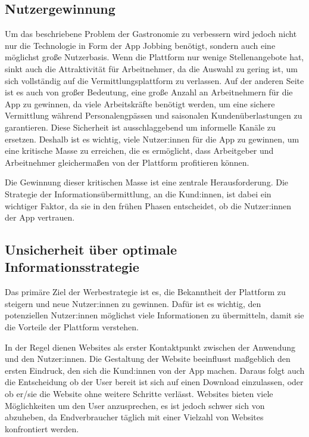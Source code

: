 \subsection{Nutzergewinnung}

Um das beschriebene Problem der Gastronomie zu verbessern wird jedoch nicht nur die 
Technologie in Form der App Jobbing benötigt, sondern auch eine möglichst große Nutzerbasis.
Wenn die Plattform nur wenige Stellenangebote hat, sinkt auch die Attraktivität für
Arbeitnehmer, da die Auswahl zu gering ist, um sich vollständig auf die Vermittlungsplattform
zu verlassen. Auf der anderen Seite ist es auch von großer Bedeutung, eine große Anzahl an
Arbeitnehmern für die App zu gewinnen, da viele Arbeitskräfte benötigt werden,
um eine sichere Vermittlung während Personalengpässen und saisonalen Kundenüberlastungen zu
garantieren. Diese Sicherheit ist ausschlaggebend um informelle Kanäle zu ersetzen.
Deshalb ist es wichtig, viele Nutzer:innen für die App zu gewinnen, um eine kritische Masse zu
erreichen, die es ermöglicht, dass Arbeitgeber und Arbeitnehmer gleichermaßen von der
Plattform profitieren können.

Die Gewinnung dieser kritischen Masse ist eine zentrale Herausforderung. Die Strategie der
Informationsübermittlung, an die Kund:innen, ist dabei ein wichtiger Faktor, da sie in den 
frühen Phasen entscheidet, ob die Nutzer:innen der App vertrauen.

\subsection{Unsicherheit über optimale Informationsstrategie}

Das primäre Ziel der Werbestrategie ist es, die Bekanntheit der Plattform zu steigern und
neue Nutzer:innen zu gewinnen. Dafür ist es wichtig, den potenziellen Nutzer:innen möglichst viele
Informationen zu übermitteln, damit sie die Vorteile der Plattform verstehen.

In der Regel dienen Websites als erster Kontaktpunkt zwischen der Anwendung und den
Nutzer:innen. Die Gestaltung der Website beeinflusst maßgeblich den ersten Eindruck, den sich 
die Kund:innen von der App machen. Daraus folgt auch die Entscheidung ob der User bereit ist
sich auf einen Download einzulassen, oder ob er/sie die Website ohne weitere Schritte verlässt.
Websites bieten viele Möglichkeiten um den User anzusprechen, es ist jedoch schwer sich von
abzuheben, da Endverbraucher täglich mit einer Vielzahl von Websites konfrontiert werden.

